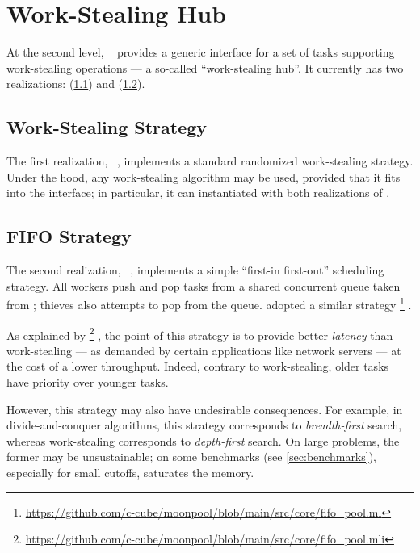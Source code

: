 \section{Work-Stealing Hub}

At the second level, ~ provides a generic interface for a set of tasks supporting work-stealing operations --- a so-called ``work-stealing hub''.
It currently has two realizations:  (\cref{sec:parabs_ws_hub_std}) and  (\cref{sec:parabs_ws_hub_fifo}).

\subsection{Work-Stealing Strategy}
\label{sec:parabs_ws_hub_std}

The first realization, ~, implements a standard randomized work-stealing strategy.
Under the hood, any work-stealing algorithm may be used, provided that it fits into the  interface; in particular, it can instantiated with both realizations of .

\subsection{FIFO Strategy}
\label{sec:parabs_ws_hub_fifo}

The second realization, ~, implements a simple ``first-in first-out'' scheduling strategy.
All workers push and pop tasks from a shared concurrent queue taken from \Saturn; thieves also attempts to pop from the queue.
\Moonpool adopted a similar strategy%
\footnote{
\url{https://github.com/c-cube/moonpool/blob/main/src/core/fifo_pool.ml}
}%
.

As explained by \citeauthor{moonpool}%
\footnote{
\url{https://github.com/c-cube/moonpool/blob/main/src/core/fifo_pool.mli}
}%
, the point of this strategy is to provide better \emph{latency} than work-stealing --- as demanded by certain applications like network servers --- at the cost of a lower throughput.
Indeed, contrary to work-stealing, older tasks have priority over younger tasks.

However, this strategy may also have undesirable consequences.
For example, in divide-and-conquer algorithms, this strategy corresponds to \emph{breadth-first} search, whereas work-stealing corresponds to \emph{depth-first} search.
On large problems, the former may be unsustainable; on some benchmarks (see \cref{sec:benchmarks}), especially for small cutoffs, \Moonpool saturates the memory.
